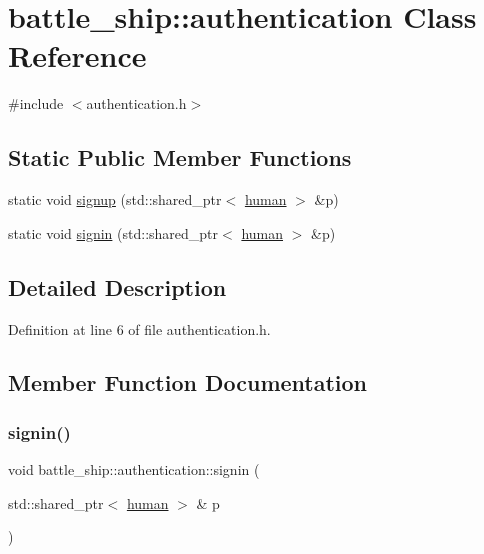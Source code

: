 \hypertarget{classbattle__ship_1_1authentication}{}\section{battle\+\_\+ship\+:\+:authentication Class Reference}
\label{classbattle__ship_1_1authentication}


{\ttfamily \#include $<$authentication.\+h$>$}

\subsection*{Static Public Member Functions}
\begin{DoxyCompactItemize}
\item 
static void \hyperlink{classbattle__ship_1_1authentication_aeb0c243e25547624235a562f657cfd63}{signup} (std\+::shared\+\_\+ptr$<$ \hyperlink{classbattle__ship_1_1human}{human} $>$ \&p)
\item 
static void \hyperlink{classbattle__ship_1_1authentication_a27046f1ace46e91bd6412ed35ddf0242}{signin} (std\+::shared\+\_\+ptr$<$ \hyperlink{classbattle__ship_1_1human}{human} $>$ \&p)
\end{DoxyCompactItemize}


\subsection{Detailed Description}


Definition at line 6 of file authentication.\+h.



\subsection{Member Function Documentation}
\mbox{\label{classbattle__ship_1_1authentication_a27046f1ace46e91bd6412ed35ddf0242}} 
\subsubsection{\texorpdfstring{signin()}{signin()}}
{\footnotesize\ttfamily void battle\+\_\+ship\+::authentication\+::signin (\begin{DoxyParamCaption}\item[{std\+::shared\+\_\+ptr$<$ \hyperlink{classbattle__ship_1_1human}{human} $>$ \&}]{p }\end{DoxyParamCaption})\hspace{0.3cm}{\ttfamily [static]}}



